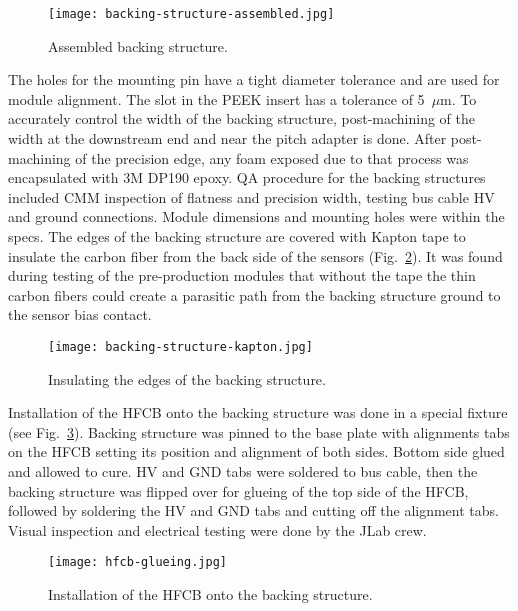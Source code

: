 \begin{figure}[hbt] 
\centering 
\texttt{[image: backing-structure-assembled.jpg]}
\caption{Assembled backing structure.}
\label{fig:backing-structure-assembled}
\end{figure}

The holes for the mounting pin have a tight diameter tolerance and are used for module alignment. The slot in the PEEK insert has a tolerance of 5~$\mu$m. To accurately control the width of the backing structure, post-machining of the width at the downstream end and near the pitch adapter is done. After post-machining of the precision edge, any foam exposed due to that process was encapsulated with 3M DP190 epoxy. QA procedure for the backing structures included CMM inspection of flatness and precision width, testing bus cable HV and ground connections. Module dimensions and mounting holes were within the specs. The edges of the backing structure are covered with Kapton tape to insulate the carbon fiber from the back side of the sensors (Fig.~\ref{fig:backing-structure-kapton}). It was found during testing of the pre-production modules that without the tape the thin carbon fibers could create a parasitic path from the backing structure ground to the sensor bias contact.

\begin{figure}[hbt] 
\centering 
\texttt{[image: backing-structure-kapton.jpg]}
\caption{Insulating the edges of the backing structure.}
\label{fig:backing-structure-kapton}
\end{figure}

Installation of the HFCB onto the backing structure was done in a special fixture (see Fig.~\ref{fig:hfcb-glueing}). Backing structure was pinned to the base plate with alignments tabs on the HFCB setting its position and alignment of both sides. Bottom side glued and allowed to cure. HV and GND tabs were soldered to bus cable, then the backing structure was flipped over for glueing of the top side of the HFCB, followed by soldering the HV and GND tabs and cutting off the alignment tabs. Visual inspection and electrical testing were done by the JLab crew.

\begin{figure}[hbt] 
\centering 
\texttt{[image: hfcb-glueing.jpg]}
\caption{Installation of the HFCB onto the backing structure.}
\label{fig:hfcb-glueing}
\end{figure}

